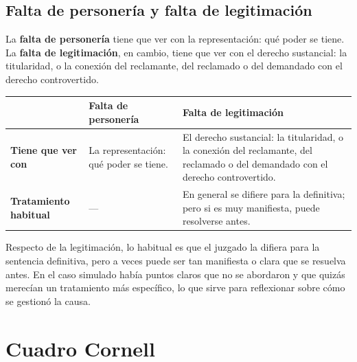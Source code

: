 \documentclass[12pt,oneside]{book}
\begin{document}
\subsection{Falta de personer\'ia y falta de legitimaci\'on}

La \textbf{falta de personer\'ia} tiene que ver con la representaci\'on: qu\'e poder se tiene. La \textbf{falta de legitimaci\'on}, en cambio, tiene que ver con el derecho sustancial: la titularidad, o la conexi\'on del reclamante, del reclamado o del demandado con el derecho controvertido.

\begin{table}[H]
\centering
\small
\begin{tabularx}{\textwidth}{>{\raggedright\arraybackslash}p{}>{\raggedright\arraybackslash}X>{\raggedright\arraybackslash}X}
\toprule
 & \textbf{Falta de personer\'ia} & \textbf{Falta de legitimaci\'on} \\
\midrule
\textbf{Tiene que ver con} & La representaci\'on: qu\'e poder se tiene. & El derecho sustancial: la titularidad, o la conexi\'on del reclamante, del reclamado o del demandado con el derecho controvertido. \\
\addlinespace
\textbf{Tratamiento habitual} & --- & En general se difiere para la definitiva; pero si es muy manifiesta, puede resolverse antes. \\
\bottomrule
\end{tabularx}
\end{table}

Respecto de la legitimaci\'on, lo habitual es que el juzgado la difiera para la sentencia definitiva, pero a veces puede ser tan manifiesta o clara que se resuelva antes. En el caso simulado hab\'ia puntos claros que no se abordaron y que quiz\'as merec\'ian un tratamiento m\'as espec\'ifico, lo que sirve para reflexionar sobre c\'omo se gestion\'o la causa.

\section{Cuadro Cornell}
\end{document}
